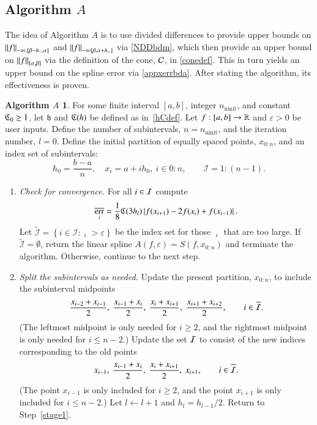 \documentclass[review]{elsarticle}
\newcommand{\abstol}{\varepsilon}
\newcommand{\zton}{0\!:\!n}
\theoremstyle{definition}
\newtheorem*{algoA}{Algorithm $A$}
\DeclareMathOperator{\ninit}{ninit}
\DeclareMathOperator{\oerr}{\overline{err}}
\begin{document}
\subsection{Algorithm $A$} \label{subsec:appxalgo}

The idea of Algorithm $A$ is to use divided differences to provide upper bounds
on $\norm[-\infty,{[\beta - h_-, \alpha]}]{f}$ and $\norm[-\infty{[\beta,
\alpha+h_+]}]{f}$ via \eqref{NDDbdm}, which then provide an upper bound on
$\norm[{[\alpha,\beta]}]{f}$ via the definition of the cone, $\cc$, in
\eqref{conedef}. This in turn yields an upper bound on the spline error via
\eqref{appxerrbda}. After stating the algorithm, its effectiveness is proven.

\begin{algoA} \label{AlgoA}
For some finite interval $[a,b]$, integer $n_{\ninit}$, and constant $\fC_0 \ge
1$, let $\fh$ and $\fC(h)$ be defined as in~\eqref{hCdef}. Let $f:[a,b] \to
\reals$ and $\abstol >0$ be user inputs. Define the number of subintervals,
$n=n_{\ninit}$, and the iteration number, $l = 0$. Define the initial partition
of equally spaced points, $x_{0:n}$, and an index set of subintervals:
\[
h_0 =\frac{b-a}{n}, \quad  x_i=a+ ih_0, \ i \in \zton, \qquad \mathcal{I} = 1\!:\!(n-1).
\]

\begin{enumerate}[\em Step 1.]

\item \label{stage1} \emph{Check for convergence.} For all $i \in \ci$ compute
\begin{equation} \label{oerrdef}
\oerr_i = \frac{1}{8} \fC(3h_l)\abs{f(x_{i+1}) - 2f(x_i) + f(x_{i-1})}.
\end{equation}
Let $\widetilde{\mathcal{I}} = \left\{i \in \mathcal{I}: \oerr_i  > \abstol \right\}$
be the index set for those $\oerr_i $ that are too large.   If $\widetilde{\mathcal{I}} =
\emptyset$, return the linear spline $A(f,\abstol) = S(f, x_{0:n})$ and terminate
the algorithm. Otherwise, continue to the next step.

\item \label{stage2} \emph{Split the subintervals as needed.}
Update the present partition, $x_{0:n}$, to include the subinterval midpoints
\[
  \frac{x_{i-2} +x_{i-1}}{2}, \ \frac{x_{i-1} +x_{i}}{2},
\ \frac{x_{i} +x_{i+1}}{2}, \  \frac{x_{i+1} +x_{i+2}}{2}, \qquad i \in \widetilde{\ci}.
\]
(The leftmost midpoint is only needed for $i \ge 2$, and the rightmost midpoint
is only needed for $i \le n-2$.) Update the set $\ci$ to consist of the new
indices corresponding to the old points
\[
x_{i-1}, \ \frac{x_{i-1} +x_{i}}{2}, \ \frac{x_{i} +x_{i+1}}{2}, \  x_{i+1},
\qquad i \in \widetilde{\ci}.
\]
(The point $x_{i-1}$ is only included for $ i \ge 2$, and the point $x_{i+1}$ is
only included for $i \le n-2$.) Let $l \leftarrow l+1$ and $h_l = h_{l-1}/2$.  Return to
Step~\ref{stage1}.
\end{enumerate}
\end{algoA}
\end{document}
